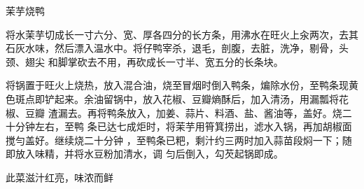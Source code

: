 \begin{recipe}{茉芋烧鸭}

\ingredients




\cooking

\step 将水茉芋切成长一寸六分、宽、厚各四分的长方条，用沸水在旺火上汆两次，去其
石灰水味，然后漂入温水中。将仔鸭宰杀，退毛，剖腹，去脏，洗净，剔骨，头颈、翅尖
和脚掌砍去不用，再砍成长一寸半、宽五分的长条块。

\step 将锅置于旺火上烧热，放入混合油，烧至冒烟时倒入鸭条，煸除水份，至鸭条现黄
色斑点即铲起来。余油留锅中，放入花椒、豆瓣熵酥后，加入清汤，用漏瓢将花椒、豆瓣
渣漏去。再将鸭条放入，加姜、蒜片、料酒、盐、酱油等，盖好。烧二十分钟左右，至鸭
条已达七成炬时，将茉芋用筲箕捞出，滤水入锅，再加胡椒面搅勻盖好。继续烧二十分钟
，至鸭条已粑，剩汁约三两时加入蒜苗段焖一下；随即放入味精，并将水豆粉加清水，调
匀后倒入，勾芡起锅即成。

\notes

此菜滋汁红亮，味浓而鲜

\end{recipe}


